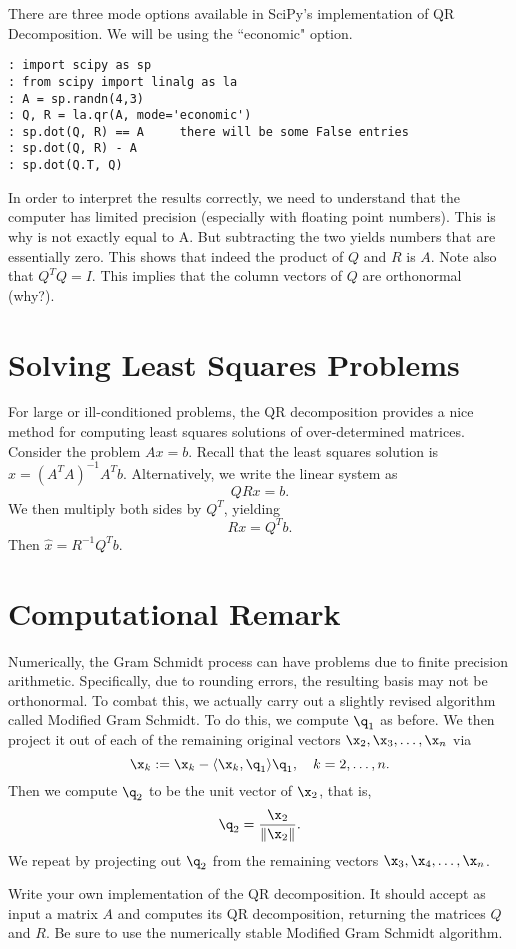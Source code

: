 \begin{python}
There are three mode options available in SciPy's implementation of QR Decomposition.  We will be using the ``economic" option.
\begin{lstlisting}[style=python]
: import scipy as sp
: from scipy import linalg as la
: A = sp.randn(4,3)
: Q, R = la.qr(A, mode='economic')
: sp.dot(Q, R) == A     there will be some False entries
: sp.dot(Q, R) - A
: sp.dot(Q.T, Q)
\end{lstlisting}
\end{python}

In order to interpret the results correctly, we need to understand that the computer has limited precision (especially with floating point numbers).  This is why  is not exactly equal to A.  But subtracting the two yields numbers that are essentially zero.  This shows that indeed the product of $Q$ and $R$ is $A$.  Note also that $Q^T Q = I$.  This implies that the column vectors of $Q$ are orthonormal (why?).

\section*{Solving Least Squares Problems}

For large or ill-conditioned problems, the QR decomposition provides
a nice method for computing least squares solutions of
over-determined matrices.  Consider the problem $A x = b$.  Recall
that the least squares solution is $\widehat x = (A^T A)^{-1}A^T b$.
Alternatively, we write the linear system as
\[
Q R x = b.
\]
We then multiply both sides by $Q^T$, yielding
\[
R x = Q^T b.
\]
Then $\widehat x = R^{-1} Q^T b$.

\section*{Computational Remark}

Numerically, the Gram Schmidt process can have problems due to
finite precision arithmetic. Specifically, due to rounding errors,
the resulting basis may not be orthonormal. To combat this, we
actually carry out a slightly revised algorithm called Modified Gram
Schmidt.  To do this, we compute $\q_1$ as before.  We then project
it out of each of the remaining original vectors
$\x_2,\x_3,\ldots,\x_n$ via
\[
\x_k := \x_k - \langle \x_{k}, \q_1\rangle \q_1,\quad k=2,\ldots,n.
\]
Then we compute $\q_2$ to be the unit vector of $\x_2$, that is,
\[
\q_2 = \frac{\x_2}{\|\x_2\|}.
\]
We repeat by projecting out $\q_2$ from the remaining vectors
$\x_3,\x_4,\ldots,\x_n$.

\begin{problem}
\label{prob:QR}
Write your own implementation of the QR decomposition.  It should accept as input a matrix $A$ and computes its QR decomposition, returning the matrices $Q$ and $R$. Be sure to use the numerically stable Modified Gram Schmidt algorithm.
\end{problem}

